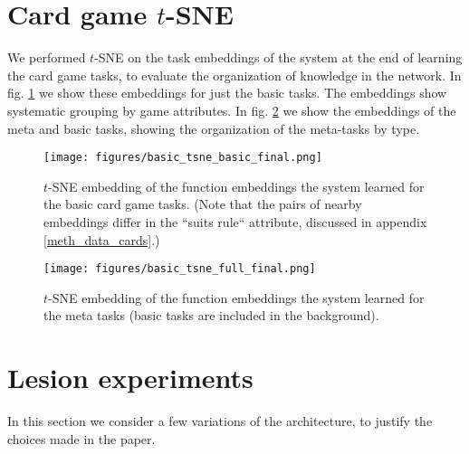 \section{Card game $t$-SNE} \label{app_cards_tsne}
We performed $t$-SNE \citep{LaurensvanderMaaten2008} on the task embeddings of the system at the end of learning the card game tasks, to evaluate the organization of knowledge in the network. In fig. \ref{fig_cards_tsne_basic} we show these embeddings for just the basic tasks. The embeddings show systematic grouping by game attributes. In fig. \ref{fig_cards_tsne_full} we show the embeddings of the meta and basic tasks, showing the organization of the meta-tasks by type. \par 
\begin{figure}[H]
\centering
\texttt{[image: figures/basic\_tsne\_basic\_final.png]}
\caption{$t$-SNE embedding of the function embeddings the system learned for the basic card game tasks. (Note that the pairs of nearby embeddings differ in the ``suits rule`` attribute, discussed in appendix \ref{meth_data_cards}.)} 
\label{fig_cards_tsne_basic}
\end{figure}%
\begin{figure}[H]
\centering
\texttt{[image: figures/basic\_tsne\_full\_final.png]}
\caption{$t$-SNE embedding of the function embeddings the system learned for the meta tasks (basic tasks are included in the background).} 
\label{fig_cards_tsne_full}
\end{figure}

\section{Lesion experiments} \label{app_lesion_results}
In this section we consider a few variations of the architecture, to justify the choices made in the paper. \par

